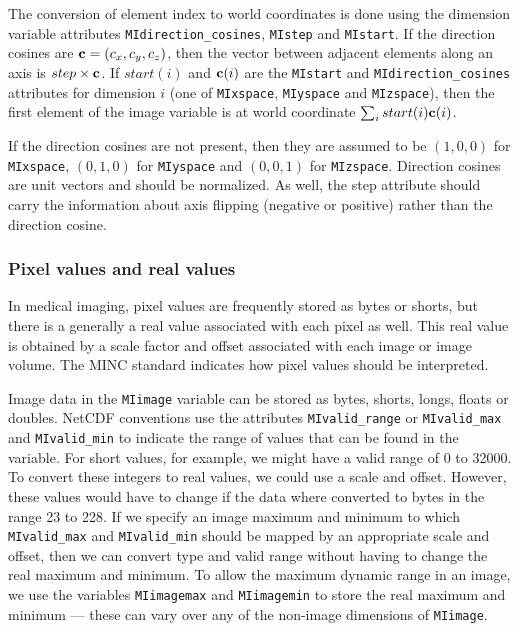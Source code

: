 The conversion of element index to world coordinates is done using the
dimension variable attributes \verb+MIdirection_cosines+,
\verb+MIstep+ and \verb+MIstart+. If the direction cosines are 
${\bf c}=(c_x, c_y, c_z)$, then the vector between adjacent elements
along an axis is $step\times {\bf c}$. If $start(i)$ and 
${\bf c}(i)$ are the \verb+MIstart+ and
\verb+MIdirection_cosines+ attributes for dimension $i$ (one of
\verb+MIxspace+, \verb+MIyspace+ and \verb+MIzspace+),
then the first element of the image variable is at world coordinate
$ \sum_i start(i) {\bf c}(i) $.

If the direction cosines are not present, then they are
assumed to be $(1,0,0)$ for \verb+MIxspace+, $(0,1,0)$ for
\verb+MIyspace+ and $(0,0,1)$ for \verb+MIzspace+. Direction cosines are
unit vectors and should be normalized. As well, the step attribute
should carry the information about axis flipping (negative or
positive) rather than the direction cosine.

\subsubsection{Pixel values and real values}

In medical imaging, pixel values are frequently stored as bytes or
shorts, but there is a generally a real value associated with each
pixel as well. This real value is obtained by a scale factor and
offset associated with each image or image volume. The MINC standard
indicates how pixel values should be interpreted. 

Image data in the \verb+MIimage+ variable can be stored as bytes, shorts,
longs, floats or doubles. NetCDF conventions use the attributes
\verb+MIvalid_range+ or \verb+MIvalid_max+ and \verb+MIvalid_min+ to
indicate the range of values that can be found in the variable. For
short values, for example, we might have a valid range of 0 to 32000.
To convert these integers to real values, we could use a scale and
offset. However, these values would have to change if the data where
converted to bytes in the range 23 to 228. If we specify an image
maximum and minimum to which \verb+MIvalid_max+ and \verb+MIvalid_min+
should be mapped by an appropriate scale and offset, then we can
convert type and valid range without having to change the real maximum
and minimum.  To allow the maximum dynamic range in an image, we use
the variables \verb+MIimagemax+ and \verb+MIimagemin+ to store the
real maximum and minimum --- these can vary over any of the non-image
dimensions of \verb+MIimage+.

